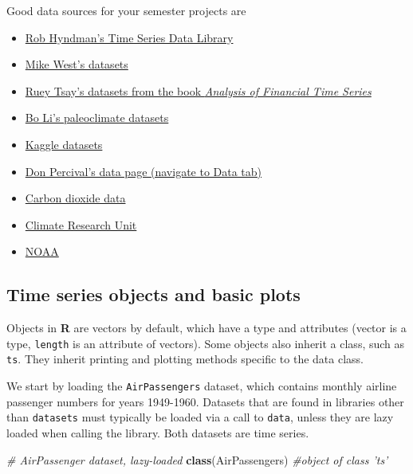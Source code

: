 \documentclass[]{book}
\newenvironment{Shaded}{\begin{snugshade}}{\end{snugshade}}
\newcommand{\CommentTok}[1]{\textcolor[rgb]{0.56,0.35,0.01}{\textit{#1}}}
\newcommand{\KeywordTok}[1]{\textcolor[rgb]{0.13,0.29,0.53}{\textbf{#1}}}
\newcommand{\NormalTok}[1]{#1}
\providecommand{\tightlist}{%
  \setlength{\itemsep}{0pt}\setlength{\parskip}{0pt}}
\begin{document}
Good data sources for your semester projects are

\begin{itemize}
\tightlist
\item
  \href{https://datamarket.com/data/list/?q=provider\%3Atsdl}{Rob
  Hyndman's Time Series Data Library}
\item
  \href{http://www2.stat.duke.edu/~mw/ts_data_sets.html}{Mike West's
  datasets}
\item
  \href{https://faculty.chicagobooth.edu/ruey.tsay/teaching/fts/}{Ruey
  Tsay's datasets from the book \emph{Analysis of Financial Time
  Series}}
\item
  \href{http://publish.illinois.edu/boli-uiuc/paleoclimate/}{Bo Li's
  paleoclimate datasets}
\item
  \href{https://www.kaggle.com/datasets}{Kaggle datasets}
\item
  \href{http://faculty.washington.edu/dbp/s519/}{Don Percival's data
  page (navigate to Data tab)}
\item
  \href{http://cdiac.esd.ornl.gov/trends/co2/contents.htm}{Carbon
  dioxide data}
\item
  \href{http://www.cru.uea.ac.uk/}{Climate Research Unit}
\item
  \href{https://data.noaa.gov/dataset}{NOAA}
\end{itemize}

\hypertarget{time-series-objects-and-basic-plots}{%
\subsection{Time series objects and basic
plots}\label{time-series-objects-and-basic-plots}}

Objects in \textbf{R} are vectors by default, which have a type and
attributes (vector is a type, \texttt{length} is an attribute of
vectors). Some objects also inherit a class, such as \texttt{ts}. They
inherit printing and plotting methods specific to the data class.

We start by loading the \texttt{AirPassengers} dataset, which contains
monthly airline passenger numbers for years 1949-1960. Datasets that are
found in libraries other than \texttt{datasets} must typically be loaded
via a call to \texttt{data}, unless they are lazy loaded when calling
the library. Both datasets are time series.

\begin{Shaded}
\begin{Highlighting}[]
\CommentTok{# AirPassenger dataset, lazy-loaded}
\KeywordTok{class}\NormalTok{(AirPassengers)  }\CommentTok{#object of class 'ts'}
\end{Highlighting}
\end{Shaded}
\end{document}
